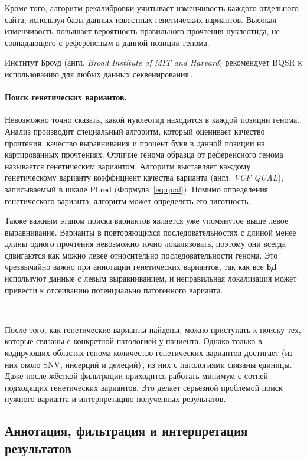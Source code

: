 \documentclass[a4paper,14pt]{extarticle}
\newcommand{\thousands}{тыс.}
\newcommand{\ecitep}[1]{\textenglish{\citep{#1}}}
\newcommand{\formularef}[1]{Формула~\ref{#1}}
\newcommand{\engterm}[1]{англ. \textenglish{\textit{#1}}}
\begin{document}
Кроме того, алгоритм рекалибровки учитывает изменчивость каждого отдельного сайта, используя базы данных известных генетических вариантов.
Высокая изменчивость повышает вероятность правильного прочтения нуклеотида, не совпадающего с референсным в данной позиции генома.

Институт Броуд (\engterm{Broad Institute of MIT and Harvard}) рекомендует BQSR к использованию для любых данных секвенирования\,\ecitep{Auwera_2013}.

\paragraph{Поиск генетических вариантов.}
Невозможно точно сказать, какой нуклеотид находится в каждой позиции генома.
Анализ производит специальный алгоритм, который оценивает качество прочтения, качество выравнивания и процент букв в данной позиции на картированных прочтениях.
Отличие генома образца от референсного генома называется генетическим вариантом.
Алгоритм выставляет каждому генетическому варианту коэффициент качества варианта (\engterm{VCF QUAL}), записываемый в шкале Phred (\formularef{eq:qual}).
Помимо определения генетического варианта, алгоритм может определять его зиготность.

Также важным этапом поиска вариантов является уже упомянутое выше левое выравнивание.
Варианты в повторяющихся последовательностях с длиной менее длины одного прочтения невозможно точно локализовать, поэтому они всегда сдвигаются как можно левее относительно последовательности генома.
Это чрезвычайно важно при аннотации генетических вариантов, так как все БД используют данные с левым выравниванием, и неправильная локализация может привести к отсеиванию потенциально патогенного варианта.

~

После того, как генетические варианты найдены, можно приступать к поиску тех, которые связаны с конкретной патологией у пациента.
Однако только в кодирующих областях генома количество генетических вариантов достигает \numprint[\thousands]{100} (из них около  SNV,  инсерций и  делеций)\,\ecitep{Supernat_2018}, из них с патологиями связаны единицы.
Даже после жёсткой фильтрации приходится работать минимум с сотней подходящих генетических вариантов.
Это делает серьёзной проблемой поиск нужного варианта и интерпретацию полученных результатов.

\subsection{Аннотация, фильтрация и интерпретация результатов}
\end{document}
